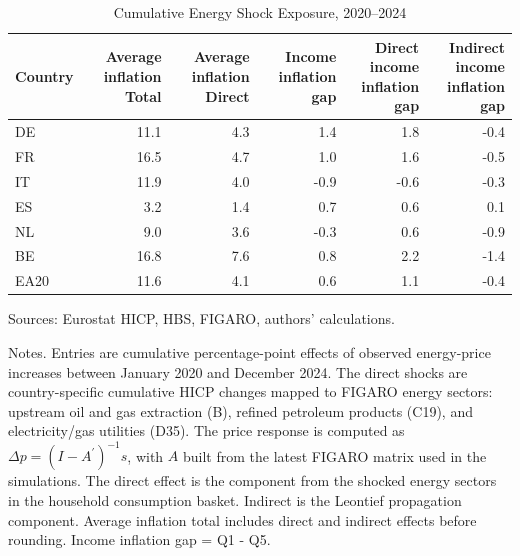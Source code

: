 \documentclass[11pt]{article}
\begin{document}
\begin{table}[H]
\centering
\caption{Cumulative Energy Shock Exposure, 2020--2024}
\scriptsize
\setlength{\tabcolsep}{4.2pt}
\begin{tabular}{lrrrrr}
\toprule
Country & \shortstack{Average inflation\\Total} & \shortstack{Average inflation\\Direct} & \shortstack{Income inflation\\gap} & \shortstack{Direct income\\inflation gap} & \shortstack{Indirect income\\inflation gap}
 \\
\midrule
DE & 11.1 & 4.3 & 1.4 & 1.8 & -0.4
 \\
FR & 16.5 & 4.7 & 1.0 & 1.6 & -0.5
 \\
IT & 11.9 & 4.0 & -0.9 & -0.6 & -0.3
 \\
ES & 3.2 & 1.4 & 0.7 & 0.6 & 0.1
 \\
NL & 9.0 & 3.6 & -0.3 & 0.6 & -0.9
 \\
BE & 16.8 & 7.6 & 0.8 & 2.2 & -1.4
 \\
EA20 & 11.6 & 4.1 & 0.6 & 1.1 & -0.4
 \\
\bottomrule
\end{tabular}
\par\vspace{0.35em}\footnotesize\noindent Sources: Eurostat HICP, HBS, FIGARO, authors' calculations.
\par\vspace{0.25em}\footnotesize\noindent Notes. Entries are cumulative percentage-point effects of observed energy-price increases between January 2020 and December 2024. The direct shocks are country-specific cumulative HICP changes mapped to FIGARO energy sectors: upstream oil and gas extraction (B), refined petroleum products (C19), and electricity/gas utilities (D35). The price response is computed as $\Delta p = (I - A^{\prime})^{-1}s$, with $A$ built from the latest FIGARO matrix used in the simulations. The direct effect is the component from the shocked energy sectors in the household consumption basket. Indirect is the Leontief propagation component. Average inflation total includes direct and indirect effects before rounding. Income inflation gap = Q1 - Q5.
\end{table}
\vspace{0.6em}
\end{document}
